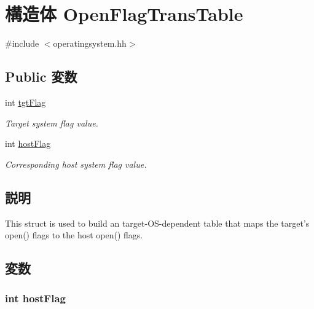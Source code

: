 \hypertarget{structOpenFlagTransTable}{
\section{構造体 OpenFlagTransTable}
\label{structOpenFlagTransTable}
}


{\ttfamily \#include $<$operatingsystem.hh$>$}\subsection*{Public 変数}
\begin{DoxyCompactItemize}
\item 
int \hyperlink{structOpenFlagTransTable_a687b99b778abecb07804f5f12764d034}{tgtFlag}
\begin{DoxyCompactList}\small\item\em Target system flag value. \item\end{DoxyCompactList}\item 
int \hyperlink{structOpenFlagTransTable_a0c245155213446c73b06dcd4ab58e6c5}{hostFlag}
\begin{DoxyCompactList}\small\item\em Corresponding host system flag value. \item\end{DoxyCompactList}\end{DoxyCompactItemize}


\subsection{説明}
This struct is used to build an target-\/OS-\/dependent table that maps the target's open() flags to the host open() flags. 

\subsection{変数}
\hypertarget{structOpenFlagTransTable_a0c245155213446c73b06dcd4ab58e6c5}{
\subsubsection[{hostFlag}]{\setlength{\rightskip}{0pt plus 5cm}int {\bf hostFlag}}}
\label{structOpenFlagTransTable_a0c245155213446c73b06dcd4ab58e6c5}


